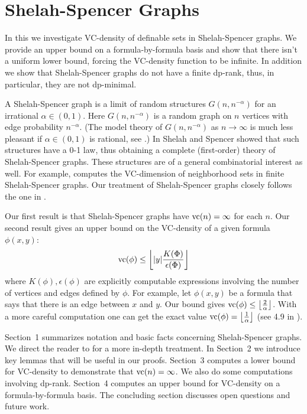 \chapter{Shelah-Spencer Graphs}
In this \chapa we investigate VC-density of definable sets in Shelah-Spencer graphs.
We provide an upper bound on a formula-by-formula basis and show that there isn't a uniform lower bound,
forcing the VC-density function to be infinite.
In addition we show that Shelah-Spencer graphs do not have a finite dp-rank,
thus, in particular, they are not dp-minimal.


A Shelah-Spencer graph is a limit of random structures $G(n, n^{-\alpha})$ for an irrational $\alpha \in (0,1)$.
Here $G(n, n^{-\alpha})$ is a random graph on $n$ vertices with edge probability $n^{-\alpha}$.
(The model theory of $G(n, n^{-\alpha})$ as $n \to \infty$ is much less pleasant if $\alpha \in (0,1)$ is rational, see \cite{rational}.)
In \cite{spencer} Shelah and Spencer showed that such structures have a 0-1 law, thus obtaining
a complete (first-order) theory of Shelah-Spencer graphs.
These structures are of a general combinatorial interest as well.
For example, \cite{anthony} computes the VC-dimension of neighborhood sets in finite Shelah-Spencer graphs.
Our treatment of Shelah-Spencer graphs closely follows the one in \cite{laskowski}.

Our first result is that Shelah-Spencer graphs have $\operatorname{vc}(n) = \infty$ for each $n$.
Our second result gives an upper bound on the VC-density of a given formula $\phi(x, y)$:
\begin{align*}
  \operatorname{vc}(\phi) \leq \left \lfloor |y|\frac{K(\Phi)}{\epsilon(\Phi)} \right \rfloor
\end{align*}
where $K(\phi), \epsilon(\phi)$ are explicitly computable expressions involving the number of vertices and edges defined by $\phi$.
For example, let $\phi(x,y)$ be a formula that says that there is an edge between $x$ and $y$.
Our bound gives $\operatorname{vc}(\phi) \leq \left \lfloor \frac{2}{\alpha} \right \rfloor$.
With a more careful computation one can get the exact value $\operatorname{vc}(\phi) = \left \lfloor \frac{1}{\alpha} \right \rfloor$ (see 4.9 in \cite{density}).

Sec\-tion~1 summarizes notation and basic facts concerning Shelah-Spencer graphs.
We direct the reader to \cite{laskowski} for a more in-depth treatment.
In Sec\-tion~2 we introduce key lemmas that will be useful in our proofs.
Sec\-tion~3 computes a lower bound for VC-density to demonstrate that $\operatorname{vc}(n) = \infty$.
We also do some computations involving dp-rank.
Sec\-tion~4 computes an upper bound for VC-density on a formula-by-formula basis.
The concluding section discusses open questions and future work.

